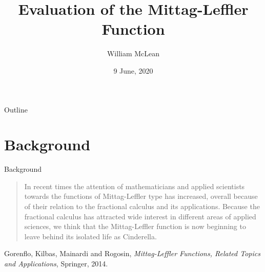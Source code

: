 \documentclass{beamer}
\title{Evaluation of the Mittag-Leffler Function}
\author{William McLean}
\date{9 June, 2020}
\begin{document}
\begin{frame}
\titlepage
\end{frame}
\begin{frame}{Outline}
\tableofcontents
\end{frame}
\section{Background}
\begin{frame}{Background}
\begin{quote}
In recent times the attention of mathematicians and applied scientists towards 
the functions of Mittag-Leffler type has increased, overall because of their 
relation to the fractional calculus and its applications. Because the 
fractional calculus has attracted wide interest in different areas of applied 
sciences, we think that the Mittag-Leffler function is now beginning to leave  
behind its isolated life as Cinderella. 
\end{quote}

Gorenflo, Kilbas, Mainardi and Rogosin, \emph{Mittag-Leffler Functions, 
Related Topics and Applications}, Springer, 2014. 
\end{frame}
\end{document}
